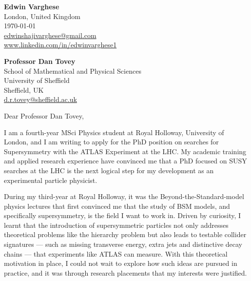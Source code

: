 \documentclass[11pt]{report}
\begin{document}
	\begin{titlepage}
		
		\begin{minipage}[t]{0.90\textwidth}
			\hfill
			\raggedleft
			\textbf{Edwin Varghese} \\
			London, United Kingdom \\
			\today\\
			\href{mailto:edwinshajivarghese@gmail.com}{edwinshajivarghese@gmail.com} \\
			\url{www.linkedin.com/in/edwinvarghese1}
		\end{minipage}
		
		\raggedright \textbf{Professor Dan Tovey} \\ School of Mathematical and Physical Sciences \\ University of Sheffield \\ Sheffield, UK\\ \href{mailto:d.r.tovey@sheffield.ac.uk}{d.r.tovey@sheffield.ac.uk}\\
		
		\vspace{0.7em}
		
		\raggedright Dear Professor Dan Tovey,\\
		\vspace{0.7em}
		
	I am a fourth-year MSci Physics student at Royal Holloway, University of London, and I am writing to apply for the PhD position on searches for Supersymmetry with the ATLAS Experiment at the LHC. My academic training and applied research experience have convinced me that a PhD focused on SUSY searches at the LHC is the next logical step for my development as an experimental particle physicist.\\
	\vspace{0.7em}
	
	During my third-year at Royal Holloway, it was the Beyond-the-Standard-model physics lectures that first convinced me that the study of BSM models, and specifically supersymmetry, is the field I want to work in. Driven by curiosity, I learnt that the introduction of supersymmetric particles not only addresses theoretical problems like the hierarchy problem but also leads to testable collider signatures --- such as missing transverse energy, extra jets and distinctive decay chains --- that experiments like ATLAS can measure. With this theoretical motivation in place, I could not wait to explore how such ideas are pursued in practice, and it was through research placements that my interests were justified.\\
	\vspace{0.7em}
	

\end{titlepage}
\end{document}
